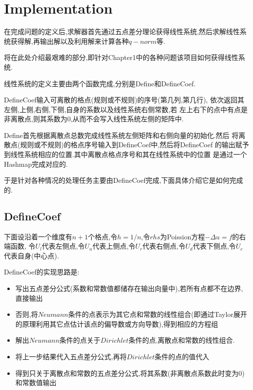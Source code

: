 \chapter{Implementation}
\label{ch:implementation}


在完成问题的定义后,求解器首先通过五点差分理论获得线性系统,然后求解线性系统获得解,再输出解以及利用解来计算各种$q-norm$等.

将在此处介绍最艰难的部分,即针对Chapter1中的各种问题该项目如何获得线性系统.

线性系统的定义主要由两个函数完成,分别是Define和DefineCoef.

DefineCoef输入可离散的格点(规则或不规则)的序号(第几列,第几行),
依次返回其左侧,上侧,右侧,下侧,自身的系数以及线性系统右侧常数,若
左上右下的点中有点是非离散点,则其系数为0,从而不会写入线性系统左侧的矩阵中.

Define首先根据离散点总数完成线性系统左侧矩阵和右侧向量的初始化.然后
将离散点(规则或不规则)的格点序号输入到DefineCoef中,然后将DefineCoef
的输出赋予到线性系统相应的位置.其中离散点格点序号和其在线性系统中的位置
是通过一个Hashmap完成对应的.

于是针对各种情况的处理任务主要由DefineCoef完成,下面具体介绍它是如何完成的.

\section{DefineCoef}

下面设沿着一个维度有$n+1$个格点,令$h=1/n$,令$rhs$为Poission方程$-\Delta u=f$的右端函数,
令$U_l$代表左侧点,令$U_u$代表上侧点,令$U_r$代表右侧点,令$U_d$代表下侧点,令$U_c$代表自身(中心点).

DefineCoef的实现思路是:
\begin{itemize}
    \item 写出五点差分公式(系数和常数值都储存在输出向量中),若所有点都不在边界,直接输出
    \item 否则,将$Neumann$条件的点表示为其它点和常数的线性组合(即通过Taylor展开的原理利用其它点估计该点的偏导数或方向导数),得到相应的方程组
    \item 解出$Neumann$条件的点关于$Dirichlet$条件的点,离散点和常数的线性组合.
    \item 将上一步结果代入五点差分公式,再将$Dirichlet$条件的点的值代入
    \item 得到只关于离散点和常数的五点差分公式,将其系数(非离散点系数此时变为0)和常数值输出
\end{itemize}

